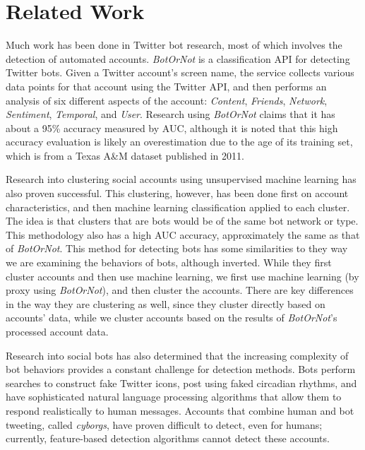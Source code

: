 \documentclass{sig-alternate-05-2015}
\begin{document}
\section{Related Work}
Much work has been done in Twitter bot research, most of which involves the detection of automated accounts. \emph{BotOrNot}\cite{Davis:BotOrNot} is a classification API for detecting Twitter bots. Given a Twitter account's screen name, the service collects various data points for that account using the Twitter API, and then performs an analysis of six different aspects of the account: \emph{Content}, \emph{Friends}, \emph{Network}, \emph{Sentiment}, \emph{Temporal}, and \emph{User}. Research using \emph{BotOrNot} claims that it has about a 95\% accuracy measured by AUC, although it is noted that this high accuracy evaluation is likely an overestimation due to the age of its training set, which is from a Texas A\&M dataset published in 2011.

Research into clustering social accounts using unsupervised machine learning has also proven successful\cite{Xiao:ClusterFakeAccounts}. This clustering, however, has been done first on account characteristics, and then machine learning classification applied to each cluster. The idea is that clusters that are bots would be of the same bot network or type. This methodology also has a high AUC accuracy, approximately the same as that of \emph{BotOrNot}. This method for detecting bots has some similarities to they way we are examining the behaviors of bots, although inverted. While they first cluster accounts and then use machine learning, we first use machine learning (by proxy using \emph{BotOrNot}), and then cluster the accounts. There are key differences in the way they are clustering as well, since they cluster directly based on accounts' data, while we cluster accounts based on the results of \emph{BotOrNot}'s processed account data.

Research into social bots has also determined that the increasing complexity of bot behaviors provides a constant challenge for detection methods. Bots perform searches to construct fake Twitter icons, post using faked circadian rhythms, and have sophisticated natural language processing algorithms that allow them to respond realistically to human messages. Accounts that combine human and bot tweeting, called \emph{cyborgs}, have proven difficult to detect\cite{Ferrara:RiseSocial}, even for humans; currently, feature-based detection algorithms cannot detect these accounts.
\end{document}
